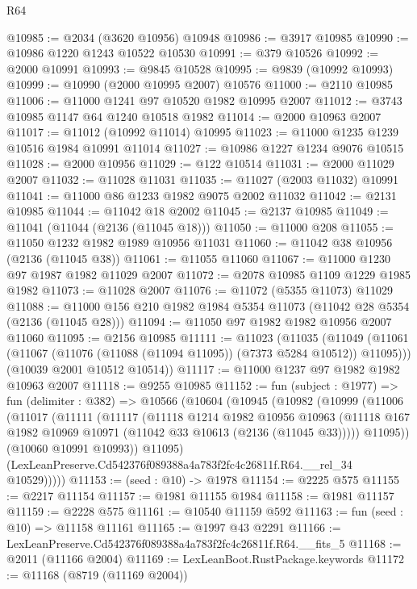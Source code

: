 \begin{lexlean}{R64}
\begin{coremodule}
@10985 := @2034 (@3620 @10956) @10948
@10986 := @3917 @10985
@10990 := @10986 @1220 @1243 @10522 @10530
@10991 := @379 @10526
@10992 := @2000 @10991
@10993 := @9845 @10528
@10995 := @9839 (@10992 @10993)
@10999 := @10990 (@2000 @10995 @2007) @10576
@11000 := @2110 @10985
@11006 := @11000 @1241 @97 @10520 @1982 @10995 @2007
@11012 := @3743 @10985 @1147 @64 @1240 @10518 @1982
@11014 := @2000 @10963 @2007
@11017 := @11012 (@10992 @11014) @10995
@11023 := @11000 @1235 @1239 @10516 @1984 @10991 @11014
@11027 := @10986 @1227 @1234 @9076 @10515
@11028 := @2000 @10956
@11029 := @122 @10514
@11031 := @2000 @11029 @2007
@11032 := @11028 @11031
@11035 := @11027 (@2003 @11032) @10991
@11041 := @11000 @86 @1233 @1982 @9075 @2002 @11032
@11042 := @2131 @10985
@11044 := @11042 @18 @2002
@11045 := @2137 @10985
@11049 := @11041 (@11044 (@2136 (@11045 @18)))
@11050 := @11000 @208
@11055 := @11050 @1232 @1982 @1989 @10956 @11031
@11060 := @11042 @38 @10956 (@2136 (@11045 @38))
@11061 := @11055 @11060
@11067 := @11000 @1230 @97 @1987 @1982 @11029 @2007
@11072 := @2078 @10985 @1109 @1229 @1985 @1982
@11073 := @11028 @2007
@11076 := @11072 (@5355 @11073) @11029
@11088 := @11000 @156 @210 @1982 @1984 @5354 @11073 (@11042 @28 @5354 (@2136 (@11045 @28)))
@11094 := @11050 @97 @1982 @1982 @10956 @2007 @11060
@11095 := @2156 @10985
@11111 := @11023
    (@11035
      (@11049 (@11061 (@11067 (@11076 (@11088 (@11094 @11095)) (@7373 @5284 @10512)) @11095)))
      (@10039 @2001 @10512 @10514))
@11117 := @11000 @1237 @97 @1982 @1982 @10963 @2007
@11118 := @9255 @10985
@11152 := fun (subject : @1977) =>
  fun (delimiter : @382) =>
  @10566
    (@10604
      (@10945
        (@10982
          (@10999
            (@11006
              (@11017
                (@11111
                  (@11117
                    (@11118
                      @1214
                      @1982
                      @10956
                      @10963
                      (@11118 @167 @1982 @10969 @10971 (@11042 @33 @10613 (@2136 (@11045 @33)))))
                    @11095))
                (@10060 @10991 @10993))
              @11095)
            (LexLeanPreserve.Cd542376f089388a4a783f2fc4c26811f.R64.__rel_34 @10529)))))
@11153 := (seed : @10) -> @1978
@11154 := @2225 @575
@11155 := @2217 @11154
@11157 := @1981 @11155 @1984
@11158 := @1981 @11157
@11159 := @2228 @575
@11161 := @10540 @11159 @592
@11163 := fun (seed : @10) => @11158 @11161
@11165 := @1997 @43 @2291
@11166 := LexLeanPreserve.Cd542376f089388a4a783f2fc4c26811f.R64.__fits_5
@11168 := @2011 (@11166 @2004)
@11169 := LexLeanBoot.RustPackage.keywords
@11172 := @11168 (@8719 (@11169 @2004))

\end{coremodule}
\end{lexlean}
